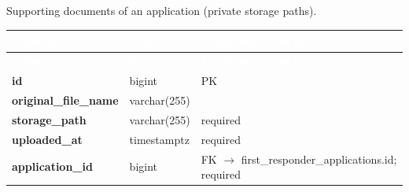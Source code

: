 \subsection*{}
Supporting documents of an application (private storage paths).\par\vspace{2pt}
{\tabfont\rowband
\begin{longtable}{@{}>{\raggedright\arraybackslash}p{}>{\raggedright\arraybackslash}p{}>{\raggedright\arraybackslash}p{}@{}}
\rowcolor{najdanavy}\textcolor{white}{\sffamily\bfseries\small Column} & \textcolor{white}{\sffamily\bfseries\small Type} & \textcolor{white}{\sffamily\bfseries\small Constraints and notes}\\
\endfirsthead
\rowcolor{najdanavy}\textcolor{white}{\sffamily\bfseries\small Column} & \textcolor{white}{\sffamily\bfseries\small Type} & \textcolor{white}{\sffamily\bfseries\small Constraints and notes}\\
\endhead
\bottomrule\endlastfoot
\textbf{id} & bigint & PK\\
\textbf{original\_\allowbreak{}file\_\allowbreak{}name} & varchar(255) & \\
\textbf{storage\_\allowbreak{}path} & varchar(255) & required\\
\textbf{uploaded\_\allowbreak{}at} & timestamptz & required\\
\textbf{application\_\allowbreak{}id} & bigint & FK $\rightarrow$ first\_\allowbreak{}responder\_\allowbreak{}applications.id; required\\
\end{longtable}}

